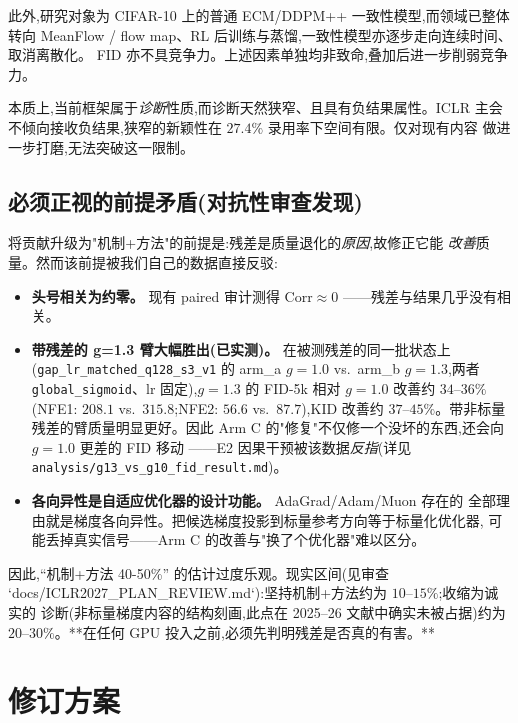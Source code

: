 \documentclass[UTF8,11pt,a4paper]{ctexart}
\begin{document}
此外,研究对象为 CIFAR-10 上的普通 ECM/DDPM++ 一致性模型,而领域已整体转向
MeanFlow / flow map、RL 后训练与蒸馏,一致性模型亦逐步走向连续时间、取消离散化。
FID 亦不具竞争力。上述因素单独均非致命,叠加后进一步削弱竞争力。

本质上,当前框架属于\emph{诊断}性质,而诊断天然狭窄、且具有负结果属性。ICLR
主会不倾向接收负结果,狭窄的新颖性在 $27.4\%$ 录用率下空间有限。仅对现有内容
做进一步打磨,无法突破这一限制。

\subsection{必须正视的前提矛盾(对抗性审查发现)}
将贡献升级为"机制+方法"的前提是:残差是质量退化的\emph{原因},故修正它能
\emph{改善}质量。然而该前提被我们自己的数据直接反驳:

\begin{itemize}
  \item \textbf{头号相关为约零。} 现有 paired 审计测得 $\mathrm{Corr}\approx 0$
        ——残差与结果几乎没有相关。
  \item \textbf{带残差的 g=1.3 臂大幅胜出(已实测)。} 在被测残差的同一批状态上
        (\texttt{gap\_lr\_matched\_q128\_s3\_v1} 的 arm\_a $g=1.0$ vs.\ arm\_b
        $g=1.3$,两者 \texttt{global\_sigmoid}、lr 固定),$g=1.3$ 的 FID-5k 相对
        $g=1.0$ 改善约 $34$--$36\%$(NFE1: $208.1$ vs.\ $315.8$;NFE2: $56.6$ vs.\
        $87.7$),KID 改善约 $37$--$45\%$。带非标量残差的臂质量明显更好。因此
        Arm C 的"修复"不仅修一个没坏的东西,还会向 $g=1.0$ 更差的 FID 移动
        ——E2 因果干预被该数据\emph{反指}(详见 \texttt{analysis/g13\_vs\_g10\_fid\_result.md})。
  \item \textbf{各向异性是自适应优化器的设计功能。} AdaGrad/Adam/Muon 存在的
        全部理由就是梯度各向异性。把候选梯度投影到标量参考方向等于标量化优化器,
        可能丢掉真实信号——Arm C 的改善与"换了个优化器"难以区分。
\end{itemize}

因此,``机制+方法 40-50\%'' 的估计过度乐观。现实区间(见审查
`docs/ICLR2027\_PLAN\_REVIEW.md`):坚持机制+方法约为 $10$--$15\%$;收缩为诚实的
诊断(非标量梯度内容的结构刻画,此点在 2025--26 文献中确实未被占据)约为
$20$--$30\%$。**在任何 GPU 投入之前,必须先判明残差是否真的有害。**

\section{修订方案}
\label{sec:contribution}
\end{document}
